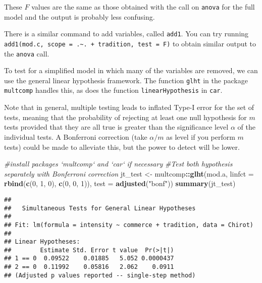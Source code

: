 \documentclass[]{book}
\newenvironment{Shaded}{\begin{snugshade}}{\end{snugshade}}
\newcommand{\CommentTok}[1]{\textcolor[rgb]{0.56,0.35,0.01}{\textit{#1}}}
\newcommand{\DataTypeTok}[1]{\textcolor[rgb]{0.13,0.29,0.53}{#1}}
\newcommand{\DecValTok}[1]{\textcolor[rgb]{0.00,0.00,0.81}{#1}}
\newcommand{\KeywordTok}[1]{\textcolor[rgb]{0.13,0.29,0.53}{\textbf{#1}}}
\newcommand{\NormalTok}[1]{#1}
\newcommand{\OperatorTok}[1]{\textcolor[rgb]{0.81,0.36,0.00}{\textbf{#1}}}
\newcommand{\StringTok}[1]{\textcolor[rgb]{0.31,0.60,0.02}{#1}}
\theoremstyle{definition}
\theoremstyle{definition}
\theoremstyle{definition}
\theoremstyle{remark}
\begin{document}
These \(F\) values are the same as those obtained with the call on
\texttt{anova} for the full model and the output is probably less
confusing.

There is a similar command to add variables, called \texttt{add1}. You
can try running
\texttt{add1(mod.c,\ scope\ =\ .\textasciitilde{}.\ +\ tradition,\ test\ =\ \textquotesingle{}F\textquotesingle{})}
to obtain similar output to the \texttt{anova} call.

To test for a simplified model in which many of the variables are
removed, we can use the general linear hypothesis framework. The
function \texttt{glht} in the package \texttt{multcomp} handles this, as
does the function \texttt{linearHypothesis} in \texttt{car}.

Note that in general, multiple testing leads to inflated Type-I error
for the set of tests, meaning that the probability of rejecting at least
one null hypothesis for \(m\) tests provided that they are all true is
greater than the significance level \(\alpha\) of the individual tests.
A Bonferroni correction (take \(\alpha/m\) as level if you perform \(m\)
tests) could be made to alleviate this, but the power to detect will be
lower.

\begin{Shaded}
\begin{Highlighting}[]
\CommentTok{#install packages `multcomp` and `car` if necessary}
\CommentTok{#Test both hypothesis separately with Bonferroni correction}
\NormalTok{jt_test <-}\StringTok{ }\NormalTok{multcomp}\OperatorTok{::}\KeywordTok{glht}\NormalTok{(mod.a, }\DataTypeTok{linfct =} \KeywordTok{rbind}\NormalTok{(}\KeywordTok{c}\NormalTok{(}\DecValTok{0}\NormalTok{, }\DecValTok{1}\NormalTok{, }\DecValTok{0}\NormalTok{), }\KeywordTok{c}\NormalTok{(}\DecValTok{0}\NormalTok{, }\DecValTok{0}\NormalTok{, }\DecValTok{1}\NormalTok{)), }
                          \DataTypeTok{test =} \KeywordTok{adjusted}\NormalTok{(}\StringTok{"bonf"}\NormalTok{))}
\KeywordTok{summary}\NormalTok{(jt_test)}
\end{Highlighting}
\end{Shaded}

\begin{verbatim}
## 
##   Simultaneous Tests for General Linear Hypotheses
## 
## Fit: lm(formula = intensity ~ commerce + tradition, data = Chirot)
## 
## Linear Hypotheses:
##        Estimate Std. Error t value  Pr(>|t|)
## 1 == 0  0.09522    0.01885   5.052 0.0000437
## 2 == 0  0.11992    0.05816   2.062    0.0911
## (Adjusted p values reported -- single-step method)
\end{verbatim}
\end{document}
